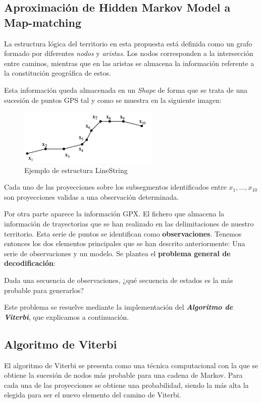 \subsection{Aproximación de Hidden Markov Model a Map-matching}
La estructura lógica del territorio en esta propuesta está definida como un grafo formado por diferentes \textit{nodos} y \textit{aristas}. Los nodos corresponden a la intersección entre caminos, mientras que en las aristas se almacena la información referente a la constitución geográfica de estos.

Esta información queda almacenada en un \textit{Shape} de forma que se trata de una sucesión de puntos \ac{GPS} tal y como se muestra en la siguiente imagen:
\begin{figure}[htb]
\begin{center}
\includegraphics[width=0.6\textwidth]{./Imagenes/LineString.png}
\caption{Ejemplo de estructura LineString}
\label{figure: LineString}
\end{center}
\end{figure}

Cada uno de las proyecciones sobre los subsegmentos identificados entre $x_{1}, ..., x_{10}$ son proyecciones validas a una observación determinada.

Por otra parte aparece la información \ac{GPX}. El fichero que almacena la información de trayectorias que se han realizado en las delimitaciones de nuestro territorio. Esta serie de puntos se identifican como \textbf{observaciones}. Tenemos entonces los dos elementos principales que se han descrito anteriormente: Una serie de observaciones y un modelo. Se plantea el \textbf{problema general de decodificación}:
\begin{center}
Dada una secuencia de observaciones, ¿qué secuencia de estados es la más probable para generarlos?
\end{center} 
Este problema se resuelve mediante la implementación del \textbf{\textit{Algoritmo de Viterbi}}, que explicamos a continuación.

\subsection{Algoritmo de Viterbi}
El algoritmo de Viterbi se presenta como una técnica computacional con la que se obtiene la 
sucesión de nodos más probable para una cadena de Markov. Para cada una de las proyecciones 
se obtiene una probabilidad, siendo la más alta la elegida para ser el nuevo elemento del camino de 
Viterbi.

